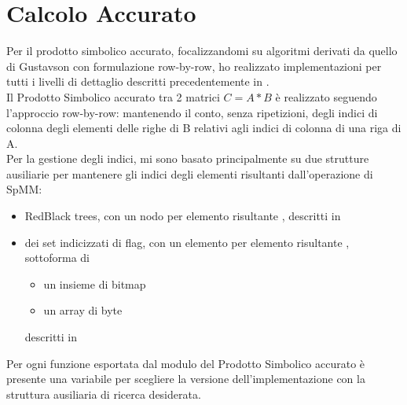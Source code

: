 \section{Calcolo Accurato}
Per il prodotto simbolico accurato, focalizzandomi su algoritmi derivati 
da quello di Gustavson  con formulazione row-by-row,
ho realizzato implementazioni per tutti i livelli di dettaglio descritti precedentemente in .\\
Il Prodotto Simbolico accurato tra 2 matrici $C=A*B$ è realizzato seguendo l'approccio row-by-row: 
mantenendo il conto, senza ripetizioni, degli indici di colonna degli elementi \nnz delle righe di B relativi agli indici di colonna di una riga di A.\\
Per la gestione degli indici, mi sono basato principalmente su due strutture ausiliarie per mantenere 
gli indici degli elementi \nnz risultanti dall'operazione di SpMM:\\
\begin{itemize}
	\item RedBlack trees, con un nodo per elemento risultante \nnz, descritti in 
	\item dei set indicizzati di flag, con un elemento  per elemento risultante \nnz, 
	sottoforma di
	\begin{itemize}
		\item un insieme di bitmap 
		\item un array di byte
	\end{itemize}
	descritti in 
\end{itemize}
Per ogni funzione esportata dal modulo del Prodotto Simbolico accurato è presente una variabile 
per scegliere la versione dell'implementazione con la struttura ausiliaria di ricerca desiderata.\\

